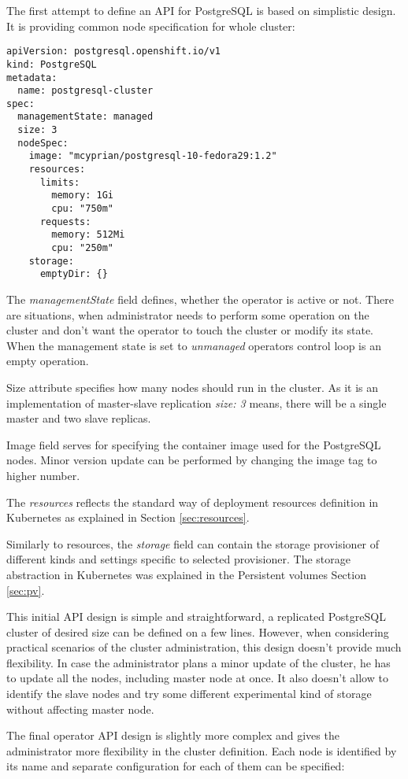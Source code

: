 \documentclass[
  digital, %
  twoside, %
  table,   %
  lof,     %
  lot,     %
]{fithesis3}
\begin{document}
The first attempt to define an API for PostgreSQL is based on simplistic design. It is providing common node specification for whole cluster:

\begin{lstlisting}
apiVersion: postgresql.openshift.io/v1
kind: PostgreSQL
metadata:
  name: postgresql-cluster
spec:
  managementState: managed
  size: 3
  nodeSpec:
    image: "mcyprian/postgresql-10-fedora29:1.2"
    resources:
      limits:
        memory: 1Gi
        cpu: "750m"
      requests:
        memory: 512Mi
        cpu: "250m"
    storage:
      emptyDir: {}
\end{lstlisting}

The \textit{managementState} field defines, whether the operator is active or not. There are situations, when administrator needs to perform some operation on the cluster and don't want the operator to touch the cluster or modify its state. When the management state is set to \textit{unmanaged} operators control loop is an empty operation.

Size attribute specifies how many nodes should run in the cluster. As it is an implementation of master-slave replication \textit{size: 3} means, there will be a single master and two slave replicas.

Image field serves for specifying the container image used for the PostgreSQL nodes. Minor version update can be performed by changing the image tag to higher number.

The \textit{resources} reflects the standard way of deployment resources definition in Kubernetes as explained in Section \ref{sec:resources}.

Similarly to resources, the \textit{storage} field can contain the storage provisioner of different kinds and settings specific to selected provisioner. The storage abstraction in Kubernetes was explained in the Persistent volumes Section \ref{sec:pv}.

This initial API design is simple and straightforward, a replicated PostgreSQL cluster of desired size can be defined on a few lines. However, when considering practical scenarios of the cluster administration, this design doesn't provide much flexibility. In case the administrator plans a minor update of the cluster, he has to update all the nodes, including master node at once. It also doesn't allow to identify the slave nodes and try some different experimental kind of storage without affecting master node.

The final operator API design is slightly more complex and gives the administrator more flexibility in the cluster definition. Each node is identified by its name and separate configuration for each of them can be specified:
\end{document}
